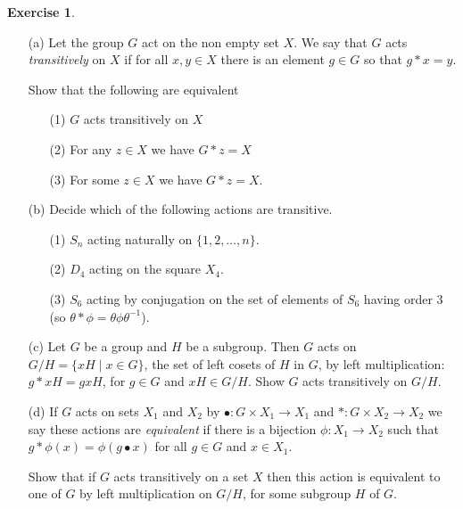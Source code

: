 \documentclass{amsart}
\newcommand{\xra}{\xrightarrow}
\renewcommand{\:}{\colon}
\newcommand{\tm}{\times}
\newcommand{\st}{\;|\;}
\newcommand{\R}{\mathbb{R}}
\theoremstyle{definition}
\newtheorem{exercise}{Exercise}
\begin{document}
\begin{exercise}
\begin{itemize}
\item[(a)] Let the group $G$ act on the non empty set $X$.  We say
 that $G$ acts \emph{transitively} on $X$ if for all $x, y \in X$
 there is an element $g\in G$ so that $g*x=y$.

 Show that the following are equivalent
 \begin{itemize}
 \item[(1)] $G$ acts transitively on $X$
 \item[(2)] For any $z\in X$ we have $G * z =X$
 \item[(3)] For some $z\in X$ we have  $G*z=X$.
 \end{itemize}
\item[(b)] Decide which of the following actions are transitive. 
 \begin{itemize}
 \item[(1)] $S_n$ acting naturally on $\{1,2,\ldots,n\}$.
 \item[(2)] $D_4$ acting on the square $X_4$.
 \item[(3)] $S_6$ acting by conjugation on the set of elements of
  $S_6$ having order 3 (so $\theta * \phi = \theta \phi \theta^{-1}$).
 \end{itemize}
\item[(c)] Let $G$ be a group and $H$ be a subgroup.  Then $G$ acts on
 $G/H=\{x H\st x \in G\}$, the set of left cosets of $H$ in $G$, by
 left multiplication: $g*xH=gxH$, for $g\in G$ and $xH\in G/H$.  Show
 $G$ acts transitively on $G/H$.
\item[(d)] If $G$ acts on sets $X_1$ and $X_2$ by
 $\bullet\:G\tm X_1\xra{}X_1$ and $*\:G\tm X_2\xra{}X_2$ we say these
 actions are \emph{equivalent} if there is a bijection
 $\phi\:X_1\xra{}X_2$ such that $g*\phi(x)=\phi(g \bullet x)$ for 
 all $g \in G$ and $x\in X_1$.

 Show that if $G$ acts transitively on a set $X$ then this action is
 equivalent to one of $G$ by left multiplication on $G/H$, for some
 subgroup $H$ of $G$.
\end{itemize}
\end{exercise}
\end{document}
